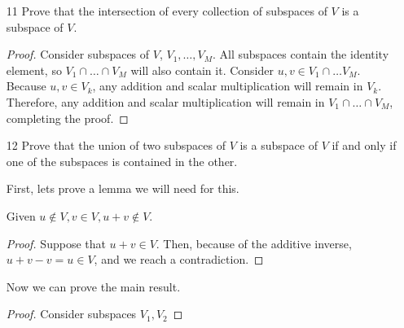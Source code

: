 \begin{enumerate}
\begin{proof}
        $f(x)$ is at its maximum of 1 whenever $x \in \mathbb{Z}$, and $g(x)$ is at its maximum of 1 whenever $x = n \pi, n \in \mathbb{Z}$. $(f + g)(x) = 2$ only when both of these conditions are met. However, this is only true when $x=0$. 

        Suppose that $x = n \pi$ and $x = m$ where $n, m \in \mathbb{Z}$. Then,
        \begin{align*}
            n \pi &= m \\
            \pi = \frac{m}{n}
        \end{align*}
        Which implies that $\pi$ is rational if $n \neq 0$, so the only solution is $x = 0$.

        Therefore, $(f + g)(x)$ reaches its maximum only at $x=0$, and there is no $p > 0$ where $(f + g)(0) = (f + g)(p)$. Therefore $(f + g)(x)$ is outside the set and it fails the additive closure condition, making it not a vector space. 
    \end{proof}

    \item[11] Prove that the intersection of every collection of subspaces of \(V\) is a subspace of \(V\).

    \begin{proof}
        Consider subspaces of $V$, $V_1, \ldots, V_M$. All subspaces contain the identity element, so $V_1 \cap \ldots \cap V_M$ will also contain it. Consider $u, v \in V_1 \cap \ldots V_M$. Because $u, v \in V_k$, any addition and scalar multiplication will remain in $V_k$. Therefore, any addition and scalar multiplication will remain in $V_1 \cap \ldots \cap V_M$, completing the proof.
    \end{proof}

    \item[12] Prove that the union of two subspaces of \(V\) is a subspace of \(V\) if and only if one of the subspaces is contained in the other.
    
    First, lets prove a lemma we will need for this.
    \begin{lemma*}
        Given $u \not \in V, v \in V, u + v \not \in V$.
    \end{lemma*}
    \begin{proof}
        Suppose that $u + v \in V$. Then, because of the additive inverse, $u + v - v = u \in V$, and we reach a contradiction.
    \end{proof}

    Now we can prove the main result.
    \begin{proof}
        Consider subspaces $V_1, V_2$ 


\end{proof}
\end{enumerate}
